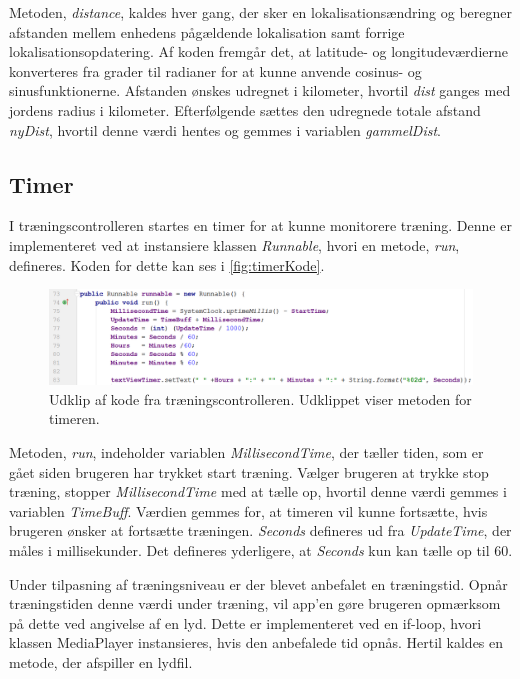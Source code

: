 \noindent
Metoden, \textit{distance}, kaldes hver gang, der sker en lokalisationsændring og beregner afstanden mellem enhedens pågældende lokalisation samt forrige lokalisationsopdatering. Af koden fremgår det, at latitude- og longitudeværdierne konverteres fra grader til radianer for at kunne anvende cosinus- og sinusfunktionerne. 
Afstanden ønskes udregnet i kilometer, hvortil \textit{dist} ganges med jordens radius i kilometer. 
Efterfølgende sættes den udregnede totale afstand \textit{nyDist}, hvortil denne værdi hentes og gemmes i variablen \textit{gammelDist}.   


\subsection*{Timer}
I træningscontrolleren startes en timer for at kunne monitorere træning. Denne er implementeret ved at instansiere klassen \textit{Runnable}, hvori en metode, \textit{run}, defineres. Koden for dette kan ses i \autoref{fig:timerKode}.

\begin{figure} [H]
\centering
\includegraphics[width=1\textwidth]{figures/imple/timerKode}
\caption{Udklip af kode fra træningscontrolleren. Udklippet viser metoden for timeren.}
\label{fig:timerKode}
\end{figure} 

\noindent
Metoden, \textit{run}, indeholder variablen \textit{MillisecondTime}, der tæller tiden, som er gået siden brugeren har trykket start træning. Vælger brugeren at trykke stop træning, stopper \textit{MillisecondTime} med at tælle op, hvortil denne værdi gemmes i variablen \textit{TimeBuff}.  Værdien gemmes for, at timeren vil kunne fortsætte, hvis brugeren ønsker at fortsætte træningen. \textit{Seconds} defineres ud fra \textit{UpdateTime}, der måles i millisekunder. Det defineres yderligere, at \textit{Seconds} kun kan tælle op til 60.

Under tilpasning af træningsniveau er der blevet anbefalet en træningstid. Opnår træningstiden denne værdi under træning, vil app'en gøre brugeren opmærksom på dette ved angivelse af en lyd. Dette er implementeret ved en if-loop, hvori klassen MediaPlayer instansieres, hvis den anbefalede tid opnås. Hertil kaldes en metode, der afspiller en lydfil. 


